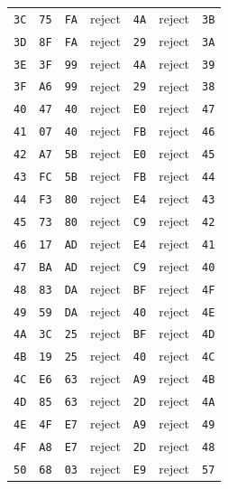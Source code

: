 \begin{longtable}{lllllll}
\texttt{3C} & \texttt{75} & \texttt{FA} & reject & \texttt{4A} & reject & \texttt{3B}\\
\texttt{3D} & \texttt{8F} & \texttt{FA} & reject & \texttt{29} & reject & \texttt{3A}\\
\texttt{3E} & \texttt{3F} & \texttt{99} & reject & \texttt{4A} & reject & \texttt{39}\\
\texttt{3F} & \texttt{A6} & \texttt{99} & reject & \texttt{29} & reject & \texttt{38}\\
\texttt{40} & \texttt{47} & \texttt{40} & reject & \texttt{E0} & reject & \texttt{47}\\
\texttt{41} & \texttt{07} & \texttt{40} & reject & \texttt{FB} & reject & \texttt{46}\\
\texttt{42} & \texttt{A7} & \texttt{5B} & reject & \texttt{E0} & reject & \texttt{45}\\
\texttt{43} & \texttt{FC} & \texttt{5B} & reject & \texttt{FB} & reject & \texttt{44}\\
\texttt{44} & \texttt{F3} & \texttt{80} & reject & \texttt{E4} & reject & \texttt{43}\\
\texttt{45} & \texttt{73} & \texttt{80} & reject & \texttt{C9} & reject & \texttt{42}\\
\texttt{46} & \texttt{17} & \texttt{AD} & reject & \texttt{E4} & reject & \texttt{41}\\
\texttt{47} & \texttt{BA} & \texttt{AD} & reject & \texttt{C9} & reject & \texttt{40}\\
\texttt{48} & \texttt{83} & \texttt{DA} & reject & \texttt{BF} & reject & \texttt{4F}\\
\texttt{49} & \texttt{59} & \texttt{DA} & reject & \texttt{40} & reject & \texttt{4E}\\
\texttt{4A} & \texttt{3C} & \texttt{25} & reject & \texttt{BF} & reject & \texttt{4D}\\
\texttt{4B} & \texttt{19} & \texttt{25} & reject & \texttt{40} & reject & \texttt{4C}\\
\texttt{4C} & \texttt{E6} & \texttt{63} & reject & \texttt{A9} & reject & \texttt{4B}\\
\texttt{4D} & \texttt{85} & \texttt{63} & reject & \texttt{2D} & reject & \texttt{4A}\\
\texttt{4E} & \texttt{4F} & \texttt{E7} & reject & \texttt{A9} & reject & \texttt{49}\\
\texttt{4F} & \texttt{A8} & \texttt{E7} & reject & \texttt{2D} & reject & \texttt{48}\\
\texttt{50} & \texttt{68} & \texttt{03} & reject & \texttt{E9} & reject & \texttt{57}\\

\end{longtable}
